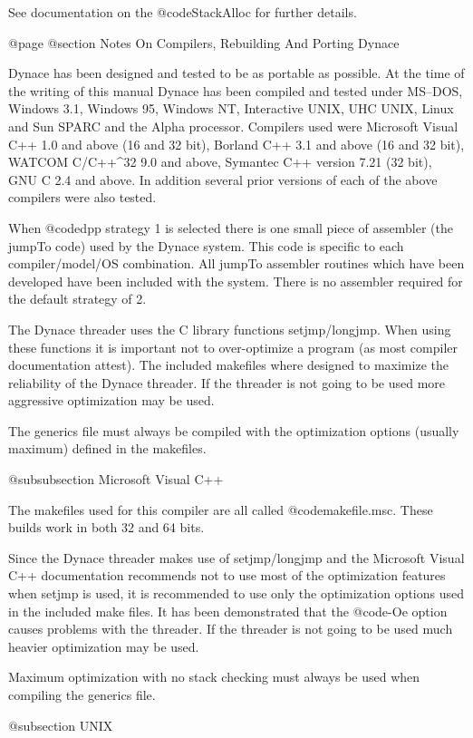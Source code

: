 See documentation on the @code{StackAlloc} for further details.


@page
@section Notes On Compilers, Rebuilding And Porting Dynace

Dynace has been designed and tested to be as portable as possible.  At
the time of the writing of this manual Dynace has been compiled and
tested under MS--DOS, Windows 3.1, Windows 95, Windows NT, Interactive
UNIX, UHC UNIX, Linux and Sun SPARC and the Alpha processor.  Compilers
used were Microsoft Visual C++ 1.0 and above (16 and 32 bit), Borland
C++ 3.1 and above (16 and 32 bit), WATCOM C/C++^32 9.0 and above,
Symantec C++ version 7.21 (32 bit), GNU C 2.4 and above.  In addition
several prior versions of each of the above compilers were also tested.

When @code{dpp} strategy 1 is selected there is one small piece of
assembler (the jumpTo code) used by the Dynace system.  This code is
specific to each compiler/model/OS combination.  All jumpTo assembler
routines which have been developed have been included with the system.
There is no assembler required for the default strategy of 2.

The Dynace threader uses the C library functions setjmp/longjmp.  When using
these functions it is important not to over-optimize a program (as most
compiler documentation attest).  The included makefiles where designed
to maximize the reliability of the Dynace threader.  If the threader is not
going to be used more aggressive optimization may be used.

The generics file must always be compiled with the optimization options
(usually maximum) defined in the makefiles.


@subsubsection Microsoft Visual C++

The makefiles used for this compiler are all called @code{makefile.msc}.
These builds work in both 32 and 64 bits.

Since the Dynace threader makes use of setjmp/longjmp and the Microsoft
Visual C++ documentation recommends not to use most of the optimization
features when setjmp is used, it is recommended to use only the
optimization options used in the included make files.  It has been
demonstrated that the @code{-Oe} option causes problems with the
threader.  If the threader is not going to be used much heavier
optimization may be used.

Maximum optimization with no stack checking must always be used when
compiling the generics file.

@subsection UNIX

